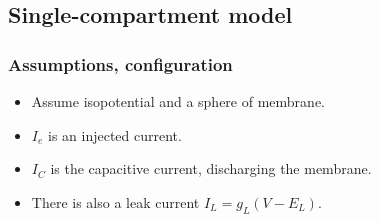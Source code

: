 \documentclass[a4paper, 12pt]{article}
\begin{document}
\subsection{Single-compartment model}
\subsubsection{Assumptions, configuration}
\begin{itemize}[noitemsep,nolistsep]
	\item Assume isopotential and a sphere of membrane.
	\item $I_e$ is an injected current.
	\item $I_C$ is the capacitive current, discharging the membrane.
	\item There is also a leak current $I_L = g_L(V-E_L)$.
\end{itemize}
\end{document}
